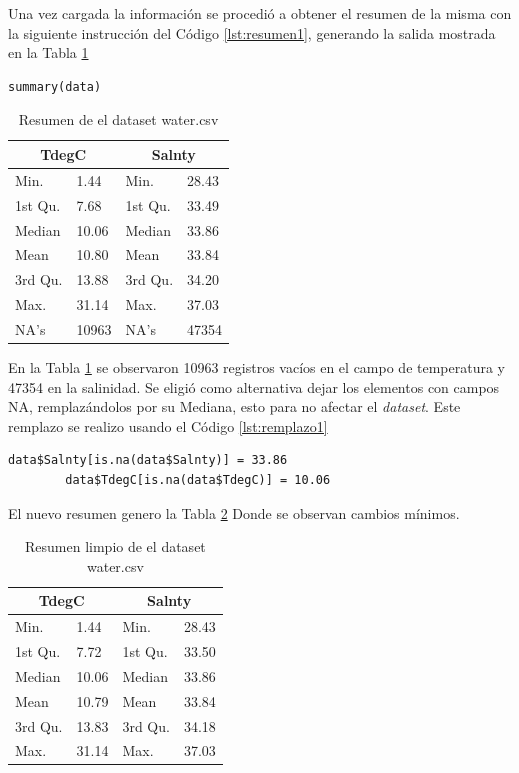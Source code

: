 \documentclass[sigconf]{acmart}
\begin{document}
	Una vez cargada la información se procedió a obtener el resumen de la misma con la siguiente instrucción del Código \ref{lst:resumen1}, generando la salida mostrada en la Tabla \ref{tab:Tabla1}
	
	\begin{lstlisting}[caption=Resumen de los datos,breaklines,label=lst:resumen1]
		summary(data)
	\end{lstlisting}
	
	\begin{table}
		\begin{tabularx}{\columnwidth}{|X|X|X|X|}
			\hline
			\multicolumn{2}{|c|}{ TdegC } & \multicolumn{2}{|c|}{ Salnty }  \\
			\hline
			Min. & 1.44  & Min. & 28.43 \\
			\hline
			1st Qu.& 7.68 &1st Qu.&33.49 \\
			\hline
			Median &10.06  & Median & 33.86   \\
			\hline
			Mean & 10.80 & Mean & 33.84\\
			\hline
			3rd Qu.&13.88 & 3rd Qu. & 34.20\\
			\hline
			Max. & 31.14 & Max.& 37.03  \\
			\hline
			NA's & 10963 & NA's  & 47354\\
			\hline
		\end{tabularx}
		\caption{\label{tab:Tabla1}Resumen de el dataset water.csv}
	\end{table}
	
	En la Tabla \ref{tab:Tabla1} se observaron 10963 registros vacíos en el campo de temperatura y 47354 en la salinidad.
	Se eligió como alternativa dejar los elementos con campos NA, remplazándolos por su Mediana, esto para no afectar el \textit{dataset}. Este remplazo se realizo usando el Código \ref{lst:remplazo1}
	
	\begin{lstlisting}[caption=Código de emplazo de los NA,breaklines,label=lst:remplazo1]
		data$Salnty[is.na(data$Salnty)] = 33.86
		data$TdegC[is.na(data$TdegC)] = 10.06
	\end{lstlisting}
	
	El nuevo resumen genero la Tabla \ref{tab:Tabla2} Donde se observan cambios mínimos.
	
	\begin{table}
		\begin{tabularx}{\columnwidth}{|X|X|X|X|}
			\hline
			\multicolumn{2}{|c|}{ TdegC } & \multicolumn{2}{c|}{ Salnty }  \\
			\hline
			Min. & 1.44  & Min. & 28.43 \\
			\hline
			1st Qu.& 7.72 &1st Qu.&33.50 \\
			\hline
			Median &10.06  & Median & 33.86   \\
			\hline
			Mean & 10.79 & Mean & 33.84\\
			\hline
			3rd Qu.&13.83 & 3rd Qu. & 34.18\\
			\hline
			Max. & 31.14 & Max.& 37.03  \\
			\hline
		\end{tabularx}
		\caption{\label{tab:Tabla2}Resumen limpio de el dataset water.csv}
	\end{table}
	
\end{document}
